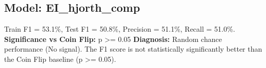 \subsection*{Model: EI_hjorth_comp}
Train F1 = 53.1\%, Test F1 = 50.8\%, Precision = 51.1\%, Recall = 51.0\%.
\newline
\textbf{Significance vs Coin Flip:} p >= 0.05
\newline
\textbf{Diagnosis:} Random chance performance (No signal). The F1 score is not statistically significantly better than the Coin Flip baseline (p >= 0.05).
